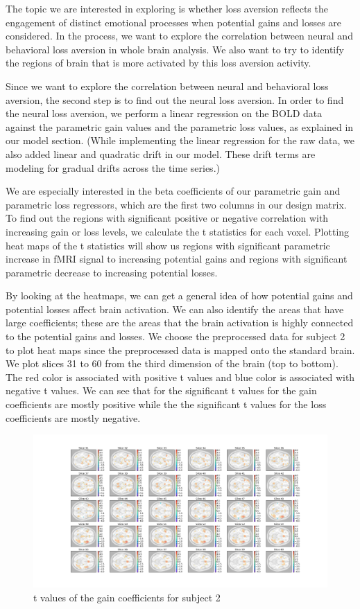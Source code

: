 The topic we are interested in exploring is whether loss aversion reflects 
the engagement of distinct emotional processes when potential gains and 
losses are considered. In the process, we want to explore the correlation 
between neural and behavioral loss aversion in whole brain analysis. We also 
want to try to identify the regions of brain that is more activated by this 
loss aversion activity.

Since we want to explore the correlation between neural and behavioral loss 
aversion, the second step is to find out the neural loss aversion. In order 
to find the neural loss aversion, we perform a linear regression on the BOLD 
data against the parametric gain values and the parametric loss values, as 
explained in our model section. (While implementing the linear regression for 
the raw data, we also added linear and quadratic drift in our model. These 
drift terms are modeling for gradual drifts across the time series.)

We are especially interested in the beta coefficients of our parametric gain 
and parametric loss regressors, which are the first two columns in our design 
matrix. To find out the regions with significant positive or negative 
correlation with increasing gain or loss levels, we calculate the t statistics 
for each voxel. Plotting heat maps of the t statistics will show us regions 
with significant parametric increase in fMRI signal to increasing potential 
gains and regions with significant parametric decrease to increasing potential 
losses.

By looking at the heatmaps, we can get a general idea of how potential gains 
and potential losses affect brain activation. We can also identify the areas 
that have large coefficients; these are the areas that the brain activation is 
highly connected to the potential gains and losses. We choose the preprocessed 
data for subject 2 to plot heat maps since the preprocessed data is mapped 
onto the standard brain. We plot slices 31 to 60 from the third dimension of 
the brain (top to bottom). The red color is associated with positive t values 
and blue color is associated with negative t values. We can see that for the 
significant t values for the gain coefficients are mostly positive while the
the significant t values for the loss coefficients are mostly negative.

\begin{figure}[H]
    \centering
        \includegraphics[scale=0.3]{figures/t_gain_standard_sub2.png}
    \caption{t values of the gain coefficients for subject 2}
\end{figure}

